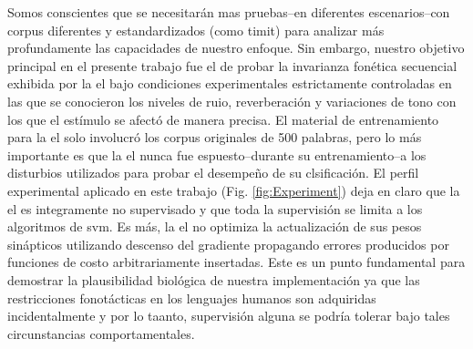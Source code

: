 {Somos conscientes que se necesitarán mas pruebas--en diferentes escenarios--con corpus diferentes y estandardizados (como \gls{timit}) para analizar más profundamente las capacidades de nuestro enfoque.
Sin embargo, nuestro objetivo principal en el presente trabajo fue el de probar la invarianza fonética secuencial exhibida por la \gls{el} bajo condiciones experimentales estrictamente controladas en las que se conocieron los niveles de ruio, reverberación y variaciones de tono con los que el estímulo se afectó de manera precisa. El material de entrenamiento para la \gls{el} solo involucró los corpus originales de 500 palabras, pero lo más importante es que la \gls{el} nunca fue espuesto--durante su entrenamiento--a los disturbios utilizados para probar el desempeño de su clsificación. El perfil experimental aplicado en este trabajo (Fig. \ref{fig:Experiment}) deja en claro que la \gls{el} es integramente no supervisado y que toda la supervisión se limita a los algoritmos de \gls{svm}. Es más, la \gls{el} no optimiza la actualización de sus pesos sinápticos utilizando descenso del gradiente propagando errores producidos por funciones de costo arbitrariamente insertadas. Este es un punto fundamental para demostrar la plausibilidad biológica de nuestra implementación ya que las restricciones fonotácticas en los  lenguajes humanos son adquiridas incidentalmente \cite{BRENT199693,saffran_1997} y por lo taanto, supervisión alguna se podría tolerar bajo tales circunstancias comportamentales.

}

